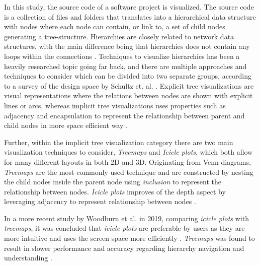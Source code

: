 In this study, the source code of a software project is visualized.
The source code is a collection of files and folders that translates into a hierarchical data structure with nodes where each node can contain, or link to, a set of child nodes generating a tree-structure.
Hierarchies are closely related to network data structures, with the main difference being that hierarchies does not contain any loops within the connections \cite{spence_information_2014}.
Techniques to visualize hierarchies has been a heavily researched topic going far back, and there are multiple approaches and techniques to consider which can be divided into two separate groups, according to a survey of the design space by Schultz et. al. \cite{schulz_design_2011}.
Explicit tree visualizations are visual representations where the relations between nodes are shown with explicit lines or arcs, whereas implicit tree visualizations uses properties such as adjacency and encapsulation to represent the relationship between parent and child nodes in more space efficient way \cite{schulz_design_2011}.

Further, within the implicit tree visualization category there are two main visualization techniques to consider, \textit{Treemaps} and \textit{Icicle plots}, which both allow for many different layouts in both 2D and 3D.
Originating from Venn diagrams, \textit{Treemaps} are the most commonly used technique and are constructed by nesting the child nodes inside the parent node using \textit{inclusion} to represent the relationship between nodes.
\textit{Icicle plots} improves of the depth aspect by leveraging adjacency to represent relationship between nodes \cite{schulz_design_2011}.

In a more recent study by Woodburn et al. in 2019, comparing \textit{icicle plots} with \textit{treemaps}, it was concluded that \textit{icicle plots} are preferable by users as they are more intuitive and uses the screen space more efficiently \cite{woodburn_interactive_2019}.
\textit{Treemaps} was found to result in slower performance and accuracy regarding hierarchy navigation and understanding \cite{woodburn_interactive_2019}.

